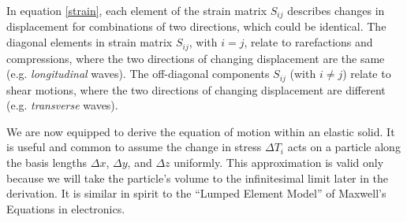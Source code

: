 \documentclass[a4paper,10pt]{report}
\numberwithin{equation}{section}
\begin{document}
In equation \eqref{strain}, each element of the strain matrix $S_{ij}$ describes
changes in displacement for combinations of two 
directions, which could be identical. The diagonal elements in strain matrix $S_{ij}$, with $i=j$, relate to rarefactions and compressions, where the two directions of changing displacement are the same 
(e.g. \emph{longitudinal} waves). The off-diagonal components $S_{ij}$ (with  $i
\neq j$) relate to shear motions, where the two directions of changing
displacement are different (e.g. \emph{transverse} waves). \cite[14]{Ballantine1997}

We are now equipped to derive the equation of motion within an elastic solid.
It is useful and common to assume the change in stress $ \Delta T_i$ acts on a
particle along the basis lengths $ \Delta x$, $ \Delta y$, 
and $ \Delta z$ uniformly. This approximation is valid only because we will take the particle's volume to the infinitesimal limit later in the derivation. It is similar in spirit to the ``Lumped Element Model'' of Maxwell's Equations in electronics.
\end{document}
